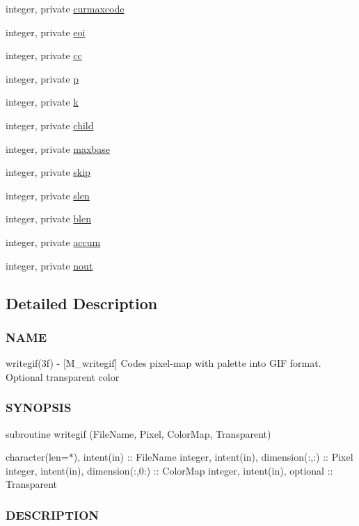 \begin{DoxyCompactItemize}
integer, private \hyperlink{namespacem__writegif_a634657dd81148fd56f39232d7ceda8b5}{curmaxcode}
\item 
integer, private \hyperlink{namespacem__writegif_a4f0ce85ba2c32d98d9c88801be25cd1f}{eoi}
\item 
integer, private \hyperlink{namespacem__writegif_a4dc9a91a4e7fde14eff0bab58278e61b}{cc}
\item 
integer, private \hyperlink{namespacem__writegif_a34d3a64b1381a281909da380d922d770}{p}
\item 
integer, private \hyperlink{namespacem__writegif_a29211b5bf371e3be08c3047bc80d3e91}{k}
\item 
integer, private \hyperlink{namespacem__writegif_a5e1b83b3bc6e486c730832371c48f6e0}{child}
\item 
integer, private \hyperlink{namespacem__writegif_ae052e1663af721294a611d19b300a8ef}{maxbase}
\item 
integer, private \hyperlink{namespacem__writegif_aaf7927ca24ee3d409138c18d7d254433}{skip}
\item 
integer, private \hyperlink{namespacem__writegif_ad3e590b43489ea5d2c357953adaca817}{slen}
\item 
integer, private \hyperlink{namespacem__writegif_add860aadf7250b3b589b697cc90fcccf}{blen}
\item 
integer, private \hyperlink{namespacem__writegif_a2a80a14e30c6ed2b0003d46a93480531}{accum}
\item 
integer, private \hyperlink{namespacem__writegif_a91b7b1d0dd2ced615d855f3440716415}{nout}
\end{DoxyCompactItemize}


\subsection{Detailed Description}
\subsubsection*{N\+A\+ME}

writegif(3f) -\/ \mbox{[}M\+\_\+writegif\mbox{]} Codes pixel-\/map with palette into G\+IF format. Optional transparent color \subsubsection*{S\+Y\+N\+O\+P\+S\+IS}

subroutine writegif (File\+Name, Pixel, Color\+Map, Transparent)

character(len=$\ast$), intent(in) \+:\+: File\+Name integer, intent(in), dimension(\+:,\+:) \+:\+: Pixel integer, intent(in), dimension(\+:,0\+:) \+:\+: Color\+Map integer, intent(in), optional \+:\+: Transparent \subsubsection*{D\+E\+S\+C\+R\+I\+P\+T\+I\+ON}

